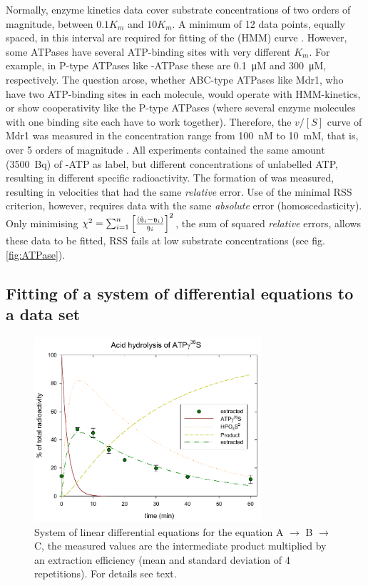 \begin{refsection}
Normally, enzyme kinetics data cover substrate concentrations of two orders of magnitude, between \(0.1 K_m \) and \(10 K_m \). A  minimum of \num{12} data points, equally spaced, in this interval are required for fitting of the  (HMM) curve \parencite{Rit-96}. However, some ATPases have several ATP-binding sites with very different \(K_m \). For example, in P-type ATPases like -ATPase these are \SI{0.1}{\micro M} and \SI{300}{\micro M}, respectively. The question arose, whether ABC-type ATPases like Mdr1, who have two ATP-binding sites in each molecule, would operate with HMM-kinetics, or show cooperativity like the P-type ATPases (where several enzyme molecules with one binding site each have to work together). Therefore, the \( v / [S] \) curve of Mdr1 was measured in the concentration range from \SI{100}{nM} to \SI{10}{mM}, that is, over 5 orders of magnitude \parencite{Bux-99b}. All experiments contained the same amount (\SI{3500}{Bq}) of \textgamma{}-ATP as label, but different concentrations of unlabelled ATP, resulting in different specific radioactivity. The formation of  was measured, resulting in velocities that had the same \emph{relative} error. Use of the minimal \acs{RSS} criterion, however, requires data with the same \emph{absolute} error (homoscedasticity). Only minimising \(\chi^2 = \sum_{i=1}^n{\left[\frac{(\hat{\mathfrak{y}}_i - \mathfrak{y}_i)}{\mathfrak{y}_i}\right]^2} \), the sum of squared \emph{relative} errors, allows these data to be fitted, \acs{RSS} fails at low substrate concentrations (see fig. \ref{fig:ATPase}).

\subsection{Fitting of a system of differential equations to a data set}

\begin{figure}
 \caption{System of linear differential equations for the equation A \(\rightarrow \) B \(\rightarrow \) C, the measured values are the intermediate product multiplied by an extraction efficiency (mean and standard deviation of 4 repetitions). For details see text. }
 \label{fig:extract}
 \centering
 \includegraphics[width=0.75\textwidth]{Graphics/FitSystem}
\end{figure}


\end{refsection}
